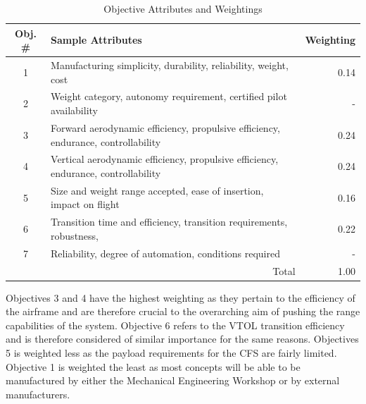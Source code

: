 \begin{table}[H]
\caption{Objective Attributes and Weightings}
\label{tab:objective-attributes-weightings}
\centering
\begin{tabular}{|c|p{10cm}|r|}
\hline
\multicolumn{1}{|c|}{\textbf{Obj. \#}}     & \textbf{Sample Attributes}           & \multicolumn{1}{c|}{\textbf{Weighting}} \\\hline
1 & Manufacturing simplicity, durability, reliability, weight, cost                                     & 0.14                                   \\\hline
2 &  Weight category, autonomy requirement, certified pilot availability & -                                      \\\hline
3 &  Forward aerodynamic efficiency, propulsive efficiency, endurance, controllability & 0.24                                   \\\hline
4 &  Vertical aerodynamic efficiency, propulsive efficiency, endurance, controllability                                      & 0.24                                   \\\hline
5 &  Size and weight range accepted, ease of insertion, impact on flight                                  & 0.16                                   \\\hline
6 &  Transition time and efficiency, transition requirements, robustness,                               & 0.22                                   \\\hline
7 &  Reliability, degree of automation, conditions required                         & -                                      \\\hline
 \multicolumn{1}{|c}{}   &        \multicolumn{1}{r|}{Total}                       & 1.00                                     \\\hline
\end{tabular}
\end{table}

Objectives 3 and 4 have the highest weighting as they pertain to the efficiency of the airframe and are therefore crucial to the overarching aim of pushing the range capabilities of the system. Objective 6 refers to the VTOL transition efficiency and is therefore considered of similar importance for the same reasons. Objectives 5 is weighted less as the payload requirements for the CFS are fairly limited. Objective 1 is weighted the least as most concepts will be able to be manufactured by either the Mechanical Engineering Workshop or by external manufacturers.\\

